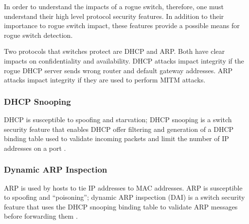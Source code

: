 \documentclass[journal]{IEEEtran}
\begin{document}
In order to understand the impacts of a rogue switch, therefore, one must understand their high
level protocol security features. In addition to their importance to rogue switch impact, these
features provide a possible means for rogue switch detection.

Two protocols that switches protect are DHCP and ARP. Both have clear impacts on confidentiality and
availability. DHCP attacks impact integrity if the rogue DHCP server sends wrong router and
default gateway addresses. ARP attacks impact integrity if they are used to perform MITM attacks.

\subsubsection{DHCP Snooping} DHCP is susceptible to spoofing and starvation; DHCP snooping is a
switch security feature that enables DHCP offer filtering and generation of a DHCP binding table
used to validate incoming packets and limit the number of IP addresses on a port \cite{b2}.

\subsubsection{Dynamic ARP Inspection} ARP is used by hosts to tie IP addresses to MAC addresses.
ARP is susceptible to spoofing and ``poisoning''; dynamic ARP inspection (DAI) is a switch security
feature that uses the DHCP snooping binding table to validate ARP messages before forwarding them
\cite{b2}.
\end{document}
